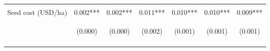 \begin{center}
\begin{tabular}{lcccccc}
\vspace{4pt} & \begin{footnotesize}[0.873]\end{footnotesize} & \begin{footnotesize}[0.803]\end{footnotesize} & \begin{footnotesize}[0.714]\end{footnotesize} & \begin{footnotesize}[0.596]\end{footnotesize} & \begin{footnotesize}[0.000]\end{footnotesize} & \begin{footnotesize}[0.000]\end{footnotesize} \\
Seed cost (USD/ha) & 0.002*** & 0.002*** & 0.011*** & 0.010*** & 0.010*** & 0.009*** \\
 & \begin{footnotesize}(0.000)\end{footnotesize} & \begin{footnotesize}(0.000)\end{footnotesize} & \begin{footnotesize}(0.002)\end{footnotesize} & \begin{footnotesize}(0.001)\end{footnotesize} & \begin{footnotesize}(0.001)\end{footnotesize} & \begin{footnotesize}(0.001)\end{footnotesize} \\
\vspace{4pt} & \begin{footnotesize}[0.000]\end{footnotesize} & \begin{footnotesize}[0.000]\end{footnotesize} & \begin{footnotesize}[0.000]\end{footnotesize} & \begin{footnotesize}[0.000]\end{footnotesize} & \begin{footnotesize}[0.000]\end{footnotesize} & \begin{footnotesize}[0.000]\end{footnotesize} \\

\end{tabular}
\end{center}
